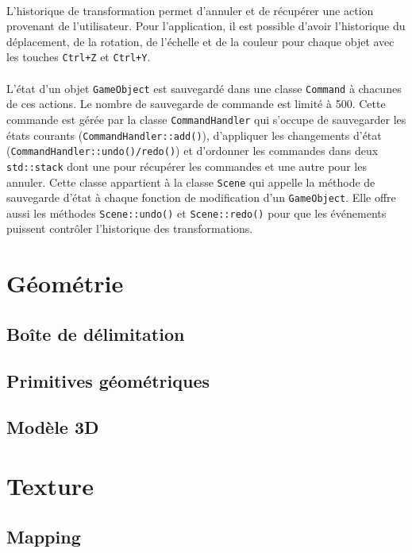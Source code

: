 \paragraph{} L'historique de transformation permet d'annuler et de récupérer une action provenant de l'utilisateur. Pour l'application, il est possible d'avoir l'historique du déplacement, de la rotation, de l'échelle et de la couleur pour chaque objet avec les touches \texttt{Ctrl+Z} et \texttt{Ctrl+Y}.
\paragraph{} L'état d'un objet \texttt{GameObject} est sauvegardé dans une classe \texttt{Command} à chacunes de ces actions. Le nombre de sauvegarde de commande est limité à 500. Cette commande est gérée par la classe \texttt{CommandHandler} qui s'occupe de sauvegarder les états courants (\texttt{CommandHandler::add()}), d'appliquer les changements d'état (\texttt{CommandHandler::undo()/redo()}) et d'ordonner les commandes dans deux \texttt{std::stack} dont une pour récupérer les commandes et une autre pour les annuler. Cette classe appartient à la classe \texttt{Scene} qui appelle la méthode de sauvegarde d'état à chaque fonction de modification d'un \texttt{GameObject}. Elle offre aussi les méthodes \texttt{Scene::undo()} et \texttt{Scene::redo()} pour que les événements puissent contrôler l'historique des transformations.

\section{Géométrie}
\subsection{Boîte de délimitation}
\subsection{Primitives géométriques}
\subsection{Modèle 3D}

\section{Texture}
\subsection{Mapping}
